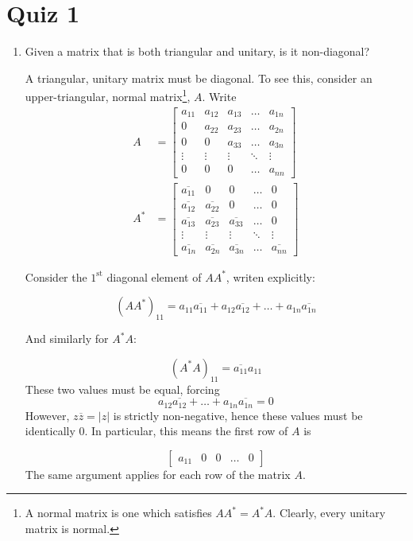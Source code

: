 \section*{Quiz 1}\label{sec:quiz-1}
\begin{enumerate}
\item Given a matrix that is both triangular and unitary, is it non-diagonal?
\begin{solution}
    A triangular, unitary matrix must be diagonal. To see this, consider an upper-triangular, normal matrix\footnote{A normal matrix is one which satisfies \(AA^*=A^*A\). Clearly, every unitary matrix is normal.}, \(A\). Write \begin{align*}A&=\begin{bmatrix}a_{11} & a_{12} & a_{13} & \hdots & a_{1n}\\0 & a_{22} & a_{23} & \hdots & a_{2n}\\0 & 0 & a_{33} & \hdots & a_{3n}\\\vdots & \vdots & \vdots & \ddots & \vdots\\0 & 0 & 0 & \hdots & a_{nn}\end{bmatrix}\\A^*&=\begin{bmatrix}\overline{a_{11}} & 0 & 0 & \hdots & 0\\\overline{a_{12}} & \overline{a_{22}} & 0 & \hdots & 0\\\overline{a_{13}} & \overline{a_{23}} & \overline{a_{33}} & \hdots & 0\\\vdots & \vdots & \vdots & \ddots & \vdots\\\overline{a_{1n}} & \overline{a_{2n}} & \overline{a_{3n}} & \hdots & \overline{a_{nn}}\end{bmatrix}\end{align*}

    Consider the \(1^{\text{st}}\) diagonal element of \(AA^*\), writen explicitly:

    \[(AA^*)_{11}=a_{11}\overline{a_{11}}+a_{12}\overline{a_{12}}+\hdots + a_{1n}\overline{a_{1n}}\]

    And similarly for \(A^*A\):

    \[(A^*A)_{11}=\overline{a_{11}}a_{11}\] These two values must be equal, forcing \[a_{12}\overline{a_{12}}+\hdots + a_{1n}\overline{a_{1n}}=0\] However, \(z\overline{z}=|z|\) is strictly non-negative, hence these values must be identically 0. In particular, this means the first row of \(A\) is 

    \[\begin{bmatrix}a_{11} & 0 & 0 & \hdots & 0\end{bmatrix}\] The same argument applies for each row of the matrix \(A\). 
        

\end{solution}
\end{enumerate}
